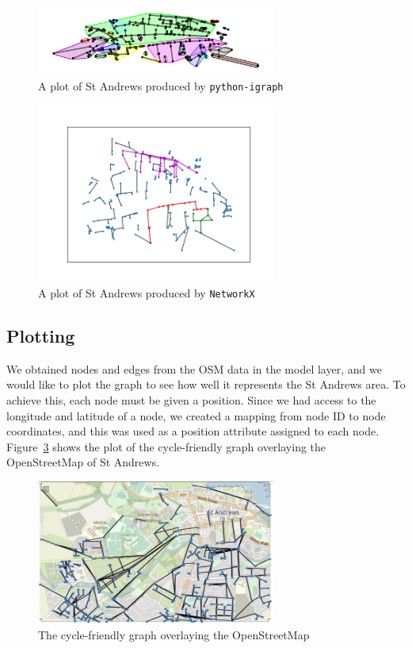 \documentclass[12pt,a4paper]{report}
\begin{document}
\begin{figure}[ht]
    \centering
    \includegraphics[width=0.7\textwidth]{diss_images/impl/igraph.png}
    \caption{A plot of St Andrews produced by \texttt{python-igraph}}
    \label{fig:igraph}
\end{figure}

\begin{figure}[ht]
    \centering
    \includegraphics[width=0.7\textwidth,trim={2.5cm 1.5cm 1.7cm 1.7cm},clip]{diss_images/impl/networkx.png}
    \caption{A plot of St Andrews produced by \texttt{NetworkX}}
    \label{fig:networkx}
\end{figure}

\subsection{Plotting}
We obtained nodes and edges from the OSM data in the model layer, and we would like to plot the graph to see how well it represents the St Andrews area. To achieve this, each node must be given a position. Since we had access to the longitude and latitude of a node, we created a mapping from node ID to node coordinates, and this was used as a position attribute assigned to each node. Figure~\ref{fig:graph layout} shows the plot of the cycle-friendly graph overlaying the OpenStreetMap of St Andrews.

\begin{figure}[ht]
    \centering
    \includegraphics[width=0.7\textwidth]{diss_images/impl/graph_layout.png}
    \caption{The cycle-friendly graph overlaying the OpenStreetMap}
    \label{fig:graph layout}
\end{figure}
\end{document}
